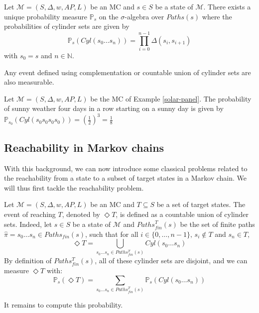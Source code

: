 \begin{theorem}\label{theo1}
  Let $\mathcal{M}=(S, \Delta, w, AP, L)$ be an MC and $s \in S$ be a state of $\mathcal{M}$. There exists a unique probability measure $\mathbb{P}_s$ on the
  $\sigma$-algebra over $Paths(s)$ where the probabilities of cylinder sets are given by
  \[
    \mathbb{P}_s(Cyl(s_0 \dots s_n)) = \prod_{i = 0}^{n - 1} \Delta(s_i, s_{i+1})
  \]
  with $s_0 = s$ and $n \in \mathbb{N}$.
\end{theorem}
\begin{corollary}
Any event defined using complementation or countable union of cylinder sets are also measurable.
\end{corollary}

\begin{example}
  Let $\mathcal{M} = (S, \Delta, w, AP, L)$ be the MC of Example \ref{solar-panel}. The probability of sunny weather four days in a row starting on a sunny day is given
  by $\mathbb{P}_{s_0}(Cyl(s_0s_0s_0s_0)) = (\frac{1}{2})^3 = \frac{1}{8}$
\end{example}

\subsection{Reachability in Markov chains} \label{obj-MC}

With this background, we can now introduce some classical problems related to the reachability from a state to a subset of target states in a Markov chain.
We will thus first tackle the reachability problem.
\begin{definition}
  Let $\mathcal{M} = (S, \Delta, w, AP, L)$ be an MC and $T \subseteq S$ be a set of target states. The event of reaching $T$, denoted by $\Diamond T$,
  is defined as a countable union of cylinder sets. Indeed, let $s \in S$ be a state of $\mathcal{M}$ and $Paths_{fin}^T(s)$ be the set of finite paths $\hat{\pi} = s_0 \dots s_n \in Paths_{fin}(s)$, such that for all $i \in \{0, \dots, n-1 \}, \, s_i \not \in T$ and $s_n \in T$,
  \[ \Diamond T = \bigcup_{s_0 \dots s_n \in Paths_{fin}^T(s)} Cyl(s_0 \dots s_n) \]
  By definition of $Paths^T_{fin}(s)$, all of these cylinder sets
  are disjoint, and we can measure $\Diamond T$ with:
  \[
    \mathbb{P}_s(\Diamond T) = \sum_{s_0 \dots s_n \in Paths_{fin}^T(s)}  \mathbb{P}_s(Cyl(s_0 \dots s_n))
  \]
\end{definition}
It remains to compute this probability.

